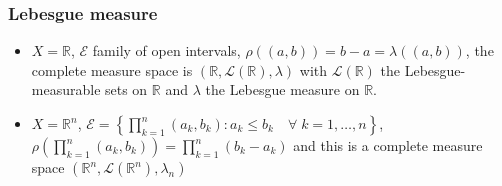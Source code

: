 \subsubsection*{Lebesgue measure}
\begin{itemize}
\item \(X = \mathbb{R}\), \(\mathcal{E}\) family of open intervals, \(\rho((a,b)) = b-a = \lambda((a,b))\), the complete measure space is \((\mathbb{R}, \mathcal{L}(\mathbb{R}), \lambda)\) with \(\mathcal{L}(\mathbb{R})\) the Lebesgue-measurable sets on \(\mathbb{R}\) and \(\lambda\) the Lebesgue measure on \(\mathbb{R}\).
\item \(X = \mathbb{R}^n\), \(\mathcal{E} = \left\lbrace \prod_{k = 1}^n (a_k, b_k): a_k \leq b_k \quad \forall \; k = 1,\ldots, n \right\rbrace\), \(\rho\left(\prod_{k = 1}^n (a_k, b_k)\right) = \prod_{k=1}^n (b_k - a_k)\) and this is a complete measure space \((\mathbb{R}^n, \mathcal{L}(\mathbb{R}^n), \lambda_n)\)
\end{itemize}
